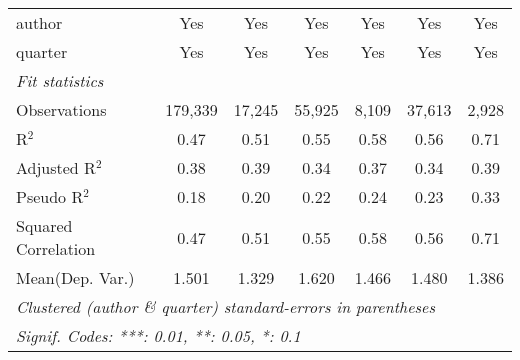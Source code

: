 \begin{tabular}{lcccccc}
   author                                                     & Yes           & Yes           & Yes          & Yes          & Yes           & Yes\\  
   quarter                                                    & Yes           & Yes           & Yes          & Yes          & Yes           & Yes\\  
   \midrule
   \emph{Fit statistics}\\
   Observations                                               & 179,339       & 17,245        & 55,925       & 8,109        & 37,613        & 2,928\\  
   R$^2$                                                      & 0.47          & 0.51          & 0.55         & 0.58         & 0.56          & 0.71\\  
   Adjusted R$^2$                                             & 0.38          & 0.39          & 0.34         & 0.37         & 0.34          & 0.39\\  
   Pseudo R$^2$                                               & 0.18          & 0.20          & 0.22         & 0.24         & 0.23          & 0.33\\  
   Squared Correlation                                        & 0.47          & 0.51          & 0.55         & 0.58         & 0.56          & 0.71\\  
Mean(Dep. Var.) & 1.501 & 1.329 & 1.620 & 1.466 & 1.480 & 1.386 \\
   \midrule \midrule
   \multicolumn{7}{l}{\emph{Clustered (author \& quarter) standard-errors in parentheses}}\\
   \multicolumn{7}{l}{\emph{Signif. Codes: ***: 0.01, **: 0.05, *: 0.1}}\\
\end{tabular}
\par\endgroup
